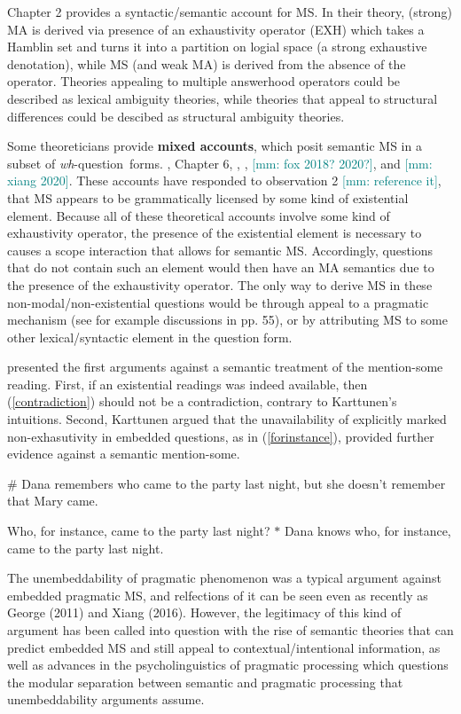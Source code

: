 \documentclass[12pt,letterpaper,table,svgnames,dvipsnames]{article}
\newcommand{\mm}[1]{\textcolor{teal}{[mm: #1]}}
\newcommand{\whq}{\emph{wh}-question~}
\begin{document}
 Chapter 2 provides a syntactic/semantic account for MS. In their theory, (strong) MA is derived via presence of an exhaustivity operator (EXH) which takes a Hamblin set and turns it into a partition on logial space (a strong exhaustive denotation), while MS (and weak MA) is derived from the absence of the operator. Theories appealing to multiple answerhood operators could be described as lexical ambiguity theories, while theories that appeal to structural differences could be descibed as structural ambiguity theories.

Some theoreticians provide \textbf{mixed accounts}, which posit semantic MS in a subset of \whq forms. , Chapter 6, , , \mm{fox 2018? 2020?}, and  \mm{xiang 2020}. These accounts have responded to observation 2 \mm{reference it}, that MS appears to be grammatically licensed by some kind of existential element. Because all of these theoretical accounts involve some kind of exhaustivity operator, the presence of the existential element is necessary to causes a scope interaction that allows for semantic MS. Accordingly, questions that do not contain such an element would then have an MA semantics due to the presence of the exhaustivity operator. The only way to derive MS in these non-modal/non-existential questions would be through appeal to a pragmatic mechanism (see for example discussions in \cite{xiang2016} pp. 55), or by attributing MS to some other lexical/syntactic element in the question form.

 presented the first arguments against a semantic treatment of the mention-some reading. First, if an existential readings was indeed available, then (\ref{contradiction}) should not be a contradiction, contrary to Karttunen's intuitions. Second, Karttunen argued that the unavailability of explicitly marked non-exhasutivity in embedded questions, as in (\ref{forinstance}), provided further evidence against a semantic mention-some.
\begin{exe}
\ex {} \label{contradiction}
    \begin{xlist}
        \ex \# Dana remembers who came to the party last night, but she doesn't remember that Mary came.
    \end{xlist}
\ex {} \label{forinstance}
    \begin{xlist}
        \ex Who, for instance, came to the party last night?
        \ex $\ast$ Dana knows who, for instance, came to the party last night.
    \end{xlist}
\end{exe}
The unembeddability of pragmatic phenomenon was a typical argument against embedded pragmatic MS, and relfections of it can be seen even as recently as George (2011) and Xiang (2016). However, the legitimacy of this kind of argument has been called into question with the rise of semantic theories that can predict embedded MS and still appeal to contextual/intentional information, as well as advances in the psycholinguistics of pragmatic processing which questions the modular separation between semantic and pragmatic processing that unembeddability arguments assume.
\end{document}

